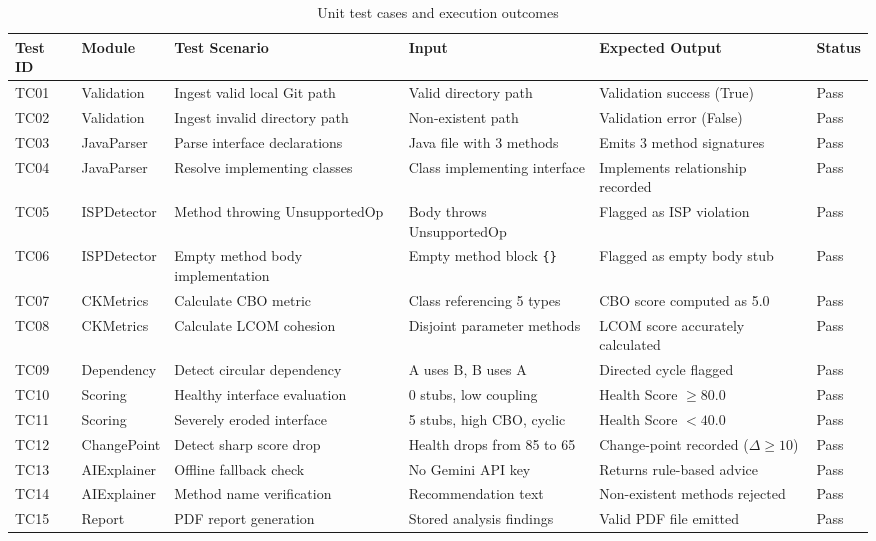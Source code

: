 \documentclass[12pt,a4paper]{article}
\begin{document}
\begin{table}[htbp]
\centering
\caption{Unit test cases and execution outcomes}
\label{tab:testcases}
\renewcommand{\arraystretch}{1.4}
\setlength{\tabcolsep}{4pt}
\scriptsize
\begin{tabular}{|C{1.0cm}|L{1.8cm}|L{2.5cm}|L{2.8cm}|L{2.5cm}|C{1.1cm}|}
\hline
\textbf{Test ID} & \textbf{Module} & \textbf{Test Scenario} & \textbf{Input} & \textbf{Expected Output} & \textbf{Status} \\
\hline
TC01 & Validation & Ingest valid local Git path & Valid directory path & Validation success (True) & Pass \\
\hline
TC02 & Validation & Ingest invalid directory path & Non-existent path & Validation error (False) & Pass \\
\hline
TC03 & JavaParser & Parse interface declarations & Java file with 3 methods & Emits 3 method signatures & Pass \\
\hline
TC04 & JavaParser & Resolve implementing classes & Class implementing interface & Implements relationship recorded & Pass \\
\hline
TC05 & ISPDetector & Method throwing UnsupportedOp & Body throws UnsupportedOp & Flagged as ISP violation & Pass \\
\hline
TC06 & ISPDetector & Empty method body implementation & Empty method block \texttt{\{\}} & Flagged as empty body stub & Pass \\
\hline
TC07 & CKMetrics & Calculate CBO metric & Class referencing 5 types & CBO score computed as 5.0 & Pass \\
\hline
TC08 & CKMetrics & Calculate LCOM cohesion & Disjoint parameter methods & LCOM score accurately calculated & Pass \\
\hline
TC09 & Dependency & Detect circular dependency & A uses B, B uses A & Directed cycle flagged & Pass \\
\hline
TC10 & Scoring & Healthy interface evaluation & 0 stubs, low coupling & Health Score $\ge 80.0$ & Pass \\
\hline
TC11 & Scoring & Severely eroded interface & 5 stubs, high CBO, cyclic & Health Score $< 40.0$ & Pass \\
\hline
TC12 & ChangePoint & Detect sharp score drop & Health drops from 85 to 65 & Change-point recorded ($\Delta \ge 10$) & Pass \\
\hline
TC13 & AIExplainer & Offline fallback check & No Gemini API key & Returns rule-based advice & Pass \\
\hline
TC14 & AIExplainer & Method name verification & Recommendation text & Non-existent methods rejected & Pass \\
\hline
TC15 & Report & PDF report generation & Stored analysis findings & Valid PDF file emitted & Pass \\
\hline
\end{tabular}
\end{table}
\end{document}
